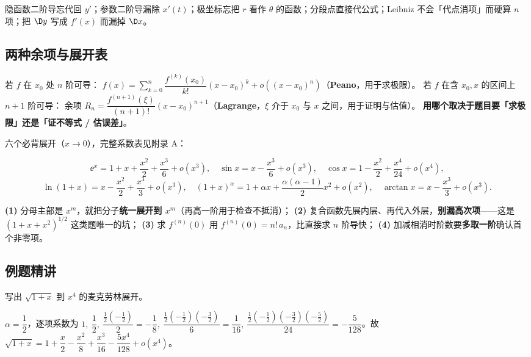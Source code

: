 \begin{warnbox}[六型各自的坑]
隐函数二阶导忘代回 $y'$；参数二阶导漏除 $x'(t)$；极坐标忘把 $r$ 看作 $\theta$ 的函数；分段点直接代公式；Leibniz 不会「代点消项」而硬算 $n$ 项；把 $\D y$ 写成 $f'(x)$ 而漏掉 $\D x$。
\end{warnbox}

\subsection{两种余项与展开表}

\begin{keypoint}
若 $f$ 在 $x_0$ 处 $n$ 阶可导：
$f(x)=\sum\limits_{k=0}^n\dfrac{f^{(k)}(x_0)}{k!}(x-x_0)^k+o\left((x-x_0)^n\right)$（\textbf{Peano}，用于求极限）。
若 $f$ 在含 $x_0,x$ 的区间上 $n+1$ 阶可导：
余项 $R_n=\dfrac{f^{(n+1)}(\xi)}{(n+1)!}(x-x_0)^{n+1}$（\textbf{Lagrange}，$\xi$ 介于 $x_0$ 与 $x$ 之间，用于证明与估值）。
\textbf{用哪个取决于题目要「求极限」还是「证不等式 / 估误差」}。
\end{keypoint}

\noindent 六个必背展开（$x\to0$），完整系数表见附录 A：

\[
\ee^x=1+x+\frac{x^2}{2}+\frac{x^3}{6}+o(x^3),\quad
\sin x=x-\frac{x^3}{6}+o(x^3),\quad
\cos x=1-\frac{x^2}{2}+\frac{x^4}{24}+o(x^4),
\]
\[
\ln(1+x)=x-\frac{x^2}{2}+\frac{x^3}{3}+o(x^3),\quad
(1+x)^\alpha=1+\alpha x+\frac{\alpha(\alpha-1)}{2}x^2+o(x^2),\quad
\arctan x=x-\frac{x^3}{3}+o(x^3).
\]

\begin{keypoint}[决策卡]
\textbf{(1)} 分母主部是 $x^m$，就把分子\textbf{统一展开到 $x^m$}（再高一阶用于检查不抵消）；
\textbf{(2)} 复合函数先展内层、再代入外层，\textbf{别漏高次项}——这是 $(1+x+x^2)^{1/2}$ 这类题唯一的坑；
\textbf{(3)} 求 $f^{(n)}(0)$ 用 $f^{(n)}(0)=n!\,a_n$，比直接求 $n$ 阶导快；
\textbf{(4)} 加减相消时阶数要\textbf{多取一阶}确认首个非零项。
\end{keypoint}

\subsection{例题精讲}

\begin{exa}
写出 $\sqrt{1+x}$ 到 $x^4$ 的麦克劳林展开。
\end{exa}
\begin{solution}
$\alpha=\dfrac12$，逐项系数为 $1,\ \dfrac12,\ \dfrac{\frac12(-\frac12)}{2}=-\dfrac18,\ 
\dfrac{\frac12(-\frac12)(-\frac32)}{6}=\dfrac1{16},\ 
\dfrac{\frac12(-\frac12)(-\frac32)(-\frac52)}{24}=-\dfrac5{128}$。故
$\sqrt{1+x}=1+\dfrac x2-\dfrac{x^2}{8}+\dfrac{x^3}{16}-\dfrac{5x^4}{128}+o(x^4)$。
\end{solution}


